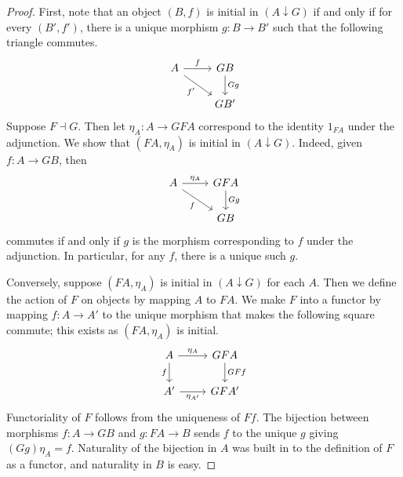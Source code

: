\begin{proof}
    First, note that an object \( (B, f) \) is initial in \( (A \downarrow G) \) if and only if for every \( (B', f') \), there is a unique morphism \( g : B \to B' \) such that the following triangle commutes.
    \[\begin{tikzcd}
        A & GB \\
        & {GB'}
        \arrow["f", from=1-1, to=1-2]
        \arrow["Gg", from=1-2, to=2-2]
        \arrow["{f'}"', from=1-1, to=2-2]
    \end{tikzcd}\]
    Suppose \( F \dashv G \).
    Then let \( \eta_A : A \to GFA \) correspond to the identity \( 1_{FA} \) under the adjunction.
    We show that \( (FA, \eta_A) \) is initial in \( (A \downarrow G) \).
    Indeed, given \( f : A \to GB \), then
\[\begin{tikzcd}
	A & GFA \\
	& GB
	\arrow["{\eta_A}", from=1-1, to=1-2]
	\arrow["Gg", from=1-2, to=2-2]
	\arrow["f"', from=1-1, to=2-2]
\end{tikzcd}\]
    commutes if and only if \( g \) is the morphism corresponding to \( f \) under the adjunction.
    In particular, for any \( f \), there is a unique such \( g \).

    Conversely, suppose \( (FA, \eta_A) \) is initial in \( (A \downarrow G) \) for each \( A \).
    Then we define the action of \( F \) on objects by mapping \( A \) to \( FA \).
    We make \( F \) into a functor by mapping \( f : A \to A' \) to the unique morphism that makes the following square commute; this exists as \( (FA, \eta_A) \) is initial.
\[\begin{tikzcd}
	A & GFA \\
	{A'} & {GFA'}
	\arrow["{\eta_A}", from=1-1, to=1-2]
	\arrow["GFf", from=1-2, to=2-2]
	\arrow["f"', from=1-1, to=2-1]
	\arrow["{\eta_{A'}}"', from=2-1, to=2-2]
\end{tikzcd}\]
    Functoriality of \( F \) follows from the uniqueness of \( Ff \).
    The bijection between morphisms \( f : A \to GB \) and \( g : FA \to B \) sends \( f \) to the unique \( g \) giving \( (Gg)\eta_A = f \).
    Naturality of the bijection in \( A \) was built in to the definition of \( F \) as a functor, and naturality in \( B \) is easy.
\end{proof}
